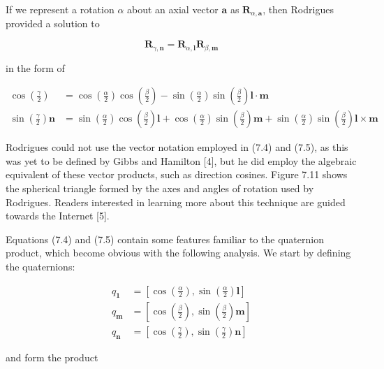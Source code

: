 \documentclass[10pt]{article}
\begin{document}
If we represent a rotation $\alpha$ about an axial vector $\mathbf{a}$ as $\mathbf{R}_{\alpha, \mathbf{a}}$, then Rodrigues provided a solution to

$$
\mathbf{R}_{\gamma, \mathbf{n}}=\mathbf{R}_{\alpha, \mathbf{l}} \mathbf{R}_{\beta, \mathbf{m}}
$$

in the form of

$$
\begin{aligned}
\cos \left(\frac{\gamma}{2}\right) & =\cos \left(\frac{\alpha}{2}\right) \cos \left(\frac{\beta}{2}\right)-\sin \left(\frac{\alpha}{2}\right) \sin \left(\frac{\beta}{2}\right) \mathbf{l} \cdot \mathbf{m} \\
\sin \left(\frac{\gamma}{2}\right) \mathbf{n} & =\sin \left(\frac{\alpha}{2}\right) \cos \left(\frac{\beta}{2}\right) \mathbf{l}+\cos \left(\frac{\alpha}{2}\right) \sin \left(\frac{\beta}{2}\right) \mathbf{m}+\sin \left(\frac{\alpha}{2}\right) \sin \left(\frac{\beta}{2}\right) \mathbf{l} \times \mathbf{m}
\end{aligned}
$$

Rodrigues could not use the vector notation employed in (7.4) and (7.5), as this was yet to be defined by Gibbs and Hamilton [4], but he did employ the algebraic equivalent of these vector products, such as direction cosines. Figure 7.11 shows the spherical triangle formed by the axes and angles of rotation used by Rodrigues. Readers interested in learning more about this technique are guided towards the Internet [5].

Equations (7.4) and (7.5) contain some features familiar to the quaternion product, which become obvious with the following analysis. We start by defining the quaternions:

$$
\begin{aligned}
q_{\mathbf{1}} & =\left[\cos \left(\frac{\alpha}{2}\right), \sin \left(\frac{\alpha}{2}\right) \mathbf{l}\right] \\
q_{\mathbf{m}} & =\left[\cos \left(\frac{\beta}{2}\right), \sin \left(\frac{\beta}{2}\right) \mathbf{m}\right] \\
q_{\mathbf{n}} & =\left[\cos \left(\frac{\gamma}{2}\right), \sin \left(\frac{\gamma}{2}\right) \mathbf{n}\right]
\end{aligned}
$$

and form the product
\end{document}
